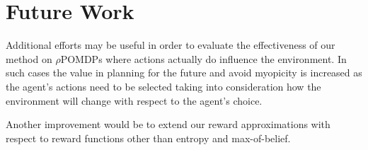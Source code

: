 \section{Future Work}

Additional efforts may be useful in order to evaluate the effectiveness of our method on
$\rho$POMDPs where actions actually do influence the environment. In such cases the value in
planning for the future and avoid myopicity is increased as the agent's actions need to be selected
taking into consideration how the environment will change with respect to the agent's choice.

Another improvement would be to extend our reward approximations with respect to reward functions
other than entropy and max-of-belief.
